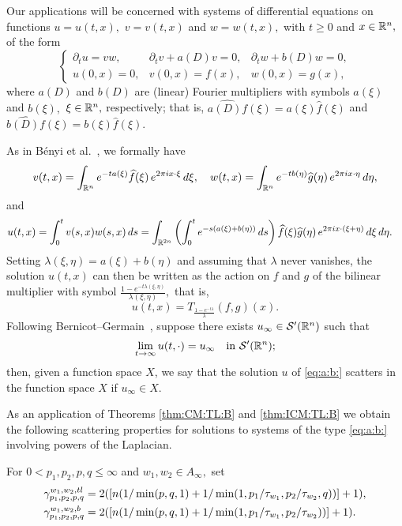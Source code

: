 Our applications will be concerned with systems of differential equations on functions $u=u(t,x),$ $v=v(t,x)$ and $w=w(t,x),$ with $t\ge 0$ and $x\in\mathbb{R}^n,$ of the form
\begin{equation} \label{eq:a:b:}
\left\{ \begin{array}{lll}  \partial_t u =vw, & \partial_t v +a(D) v = 0, & \partial_t w + b(D) w = 0, \\
  u(0,x)=0,&v(0,x)=f(x),&w(0,x) = g(x),
 \end{array} \right.
\end{equation}
 where  $a(D)$ and $b(D)$ are (linear) Fourier multipliers with symbols  $a(\xi)$ and  $b(\xi),$ $\xi\in\mathbb{R}^n,$ respectively; that is, $\widehat{a(D)f}(\xi)=a(\xi)\widehat{f}(\xi)$ and $\widehat{b(D)f}(\xi)=b(\xi)\widehat{f}(\xi)$.
 
 As in B\'enyi et al.~\cite[Section 2.3]{MR2660466}, we formally have 
$$ 
v(t,x)= \int_{\mathbb{R}^n} e^{-t a(\xi)} \widehat{f}(\xi)\, e^{2\pi i x \cdot \xi} \, d\xi,\quad w(t,x)= \int_{\mathbb{R}^n}  e^{-t b(\eta)} \widehat{g}(\eta)\,e^{2\pi i x \cdot \eta} \, d\eta,
$$
and
\begin{align*}
u(t,x) & = \int_0^t v(s,x) w(s,x) \,ds  = \int_{\mathbb{R}^{2n}} \left(\int_0^t e^{-s (a(\xi)+b(\eta))} \,ds \right) \widehat{f}(\xi) \widehat{g}(\eta) \, e^{2\pi i x \cdot (\xi + \eta)} \, d\xi\, d\eta.
\end{align*}
Setting $\lambda(\xi,\eta)=a(\xi)+b(\eta)$ and assuming that $\lambda$ never vanishes, the solution $u(t,x)$ can then be written as the action on $f$ and $g$ of the bilinear multiplier  with symbol $\frac{1-e^{-t\lambda(\xi,\eta)}}{\lambda(\xi,\eta)},$ that is,  
\begin{equation}\label{u:T:lambda}
u(t,x) = T_{\frac{1-e^{-t\lambda}}{\lambda}}(f,g)(x).
\end{equation}
Following Bernicot--Germain~\cite[Section 9.4]{MR2680189}, suppose there exists   $u_\infty\in {\mathcal{S}'}({{\mathbb R}^n})$ such that 
\begin{equation}\label{def:u:infty}
\lim\limits_{t \to \infty} u(t, \cdot ) = u_\infty \quad \text{in } {\mathcal{S}'}({{\mathbb R}^n});
\end{equation}
then, given a function space $X$, we say that the solution $u$ of  \eqref{eq:a:b:} scatters in the function space $X$ if $u_\infty \in X.$

As an application of Theorems \ref{thm:CM:TL:B} and \ref{thm:ICM:TL:B} we obtain the following scattering properties for solutions to  systems of the type \eqref{eq:a:b:} involving powers of the Laplacian. 

  

For $0<p_1,p_2, p, q\le \infty$ and $w_1,w_2\in A_\infty,$ set
\begin{align*}
\gamma_{p_1,p_2,p,q}^{w_1,w_2, tl}&=2( [n(1/\min(p,q,1)+1/\min(1,p_1/\tau_{w_1},p_2/\tau_{w_2},q))]+1),\\
 \gamma_{p_1,p_2,p,q}^{w_1,w_2,b}&=2( [n(1/\min(p,q,1)+1/\min(1,p_1/\tau_{w_1},p_2/\tau_{w_2}))]+1).
\end{align*}


